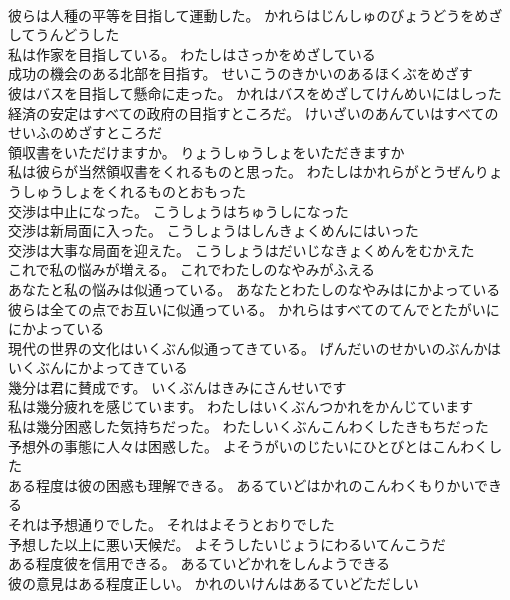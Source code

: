 \documentclass[8pt]{extreport}
\begin{document}
\begin{CJK}{UTF8}{min}
\\	彼らは人種の平等を目指して運動した。	かれらはじんしゅのびょうどうをめざしてうんどうした 
\\	私は作家を目指している。	わたしはさっかをめざしている 
\\	成功の機会のある北部を目指す。	せいこうのきかいのあるほくぶをめざす 
\\	彼はバスを目指して懸命に走った。	かれはバスをめざしてけんめいにはしった 
\\	経済の安定はすべての政府の目指すところだ。	けいざいのあんていはすべてのせいふのめざすところだ 
\\	領収書をいただけますか。	りょうしゅうしょをいただきますか 
\\	私は彼らが当然領収書をくれるものと思った。	わたしはかれらがとうぜんりょうしゅうしょをくれるものとおもった 
\\	交渉は中止になった。	こうしょうはちゅうしになった 
\\	交渉は新局面に入った。	こうしょうはしんきょくめんにはいった 
\\	交渉は大事な局面を迎えた。	こうしょうはだいじなきょくめんをむかえた 
\\	これで私の悩みが増える。	これでわたしのなやみがふえる 
\\	あなたと私の悩みは似通っている。	あなたとわたしのなやみはにかよっている 
\\	彼らは全ての点でお互いに似通っている。	かれらはすべてのてんでとたがいににかよっている 
\\	現代の世界の文化はいくぶん似通ってきている。	げんだいのせかいのぶんかはいくぶんにかよってきている 
\\	幾分は君に賛成です。	いくぶんはきみにさんせいです 
\\	私は幾分疲れを感じています。	わたしはいくぶんつかれをかんじています 
\\	私は幾分困惑した気持ちだった。	わたしいくぶんこんわくしたきもちだった 
\\	予想外の事態に人々は困惑した。	よそうがいのじたいにひとびとはこんわくした 
\\	ある程度は彼の困惑も理解できる。	あるていどはかれのこんわくもりかいできる 
\\	それは予想通りでした。	それはよそうとおりでした 
\\	予想した以上に悪い天候だ。	よそうしたいじょうにわるいてんこうだ 
\\	ある程度彼を信用できる。	あるていどかれをしんようできる 
\\	彼の意見はある程度正しい。	かれのいけんはあるていどただしい 

\end{CJK}
\end{document}
